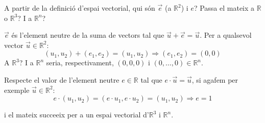\Exercise  
A partir de la definició d'espai vectorial, qui són $\vec{e}$ (a $\mathbb{R}^2$) i $e$? Passa el mateix a $\mathbb{R}$ o $\mathbb{R}^3$? I a $\mathbb{R}^n$?

\Answer

$\vec{e}$ és l'element neutre de la suma de vectors tal que $\vec{u}+\vec{e}=\vec{u}$. Per a qualsevol vector $\vec{u} \in \mathbb{R}^2$:
\[(u_1,u_2)+(e_1,e_2)=(u_1,u_2) \Rightarrow (e_1,e_2)=(0,0)\]
A $\mathbb{R}^3$? I a $\mathbb{R}^n$ seria, respectivament, $(0,0,0)$ i $(0,\ldots ,0)\in\mathbb{R}^n $.

Respecte el valor de l'element neutre $e \in \mathbb{R}$ tal que $e \cdot \vec{u} = \vec{u}$, si agafem per exemple $\vec{u}\in \mathbb{R}^2$:
\[e \cdot (u_1,u_2) = (e\cdot u_1,e\cdot u_2)= (u_1,u_2) \Rightarrow e=1\]

i el mateix succeeix per a un espai vectorial d'$\mathbb{R}^3$ i $\mathbb{R}^n$.

\blacksquare 